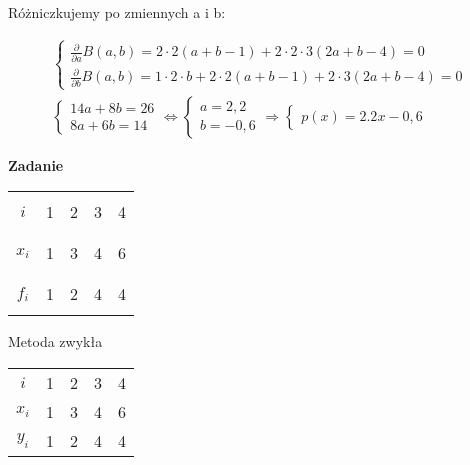 \documentclass[10pt, a4paper]{article}
\begin{document}
Różniczkujemy po zmiennych a i b:

\begin{gather*}
\begin{cases}
\frac{\partial}{\partial a}B(a,b)=2\cdot2(a+b-1)+2\cdot2\cdot3(2a+b-4)=0\\
\frac{\partial}{\partial b}B(a,b)=1\cdot2\cdot b+2\cdot2(a+b-1)+2\cdot 3(2a+b-4)=0
\end{cases}\\
\begin{cases}
14a+8b=26\\
8a+6b=14
\end{cases}
\Longleftrightarrow
\begin{cases}
a=2,2\\
b=-0,6
\end{cases}
\Rightarrow
\begin{cases}
p(x)=2.2x-0,6
\end{cases}
\end{gather*}

\textbf{Zadanie}

\begin{center}
\begin{tabular}{|c|c|c|c|c|}
\hline
&&&&\\
$i$&1&2&3&4\\
&&&&\\
\hline
&&&&\\
$x_i$&1&3&4&6\\
&&&&\\
\hline
&&&&\\
$f_i$&1&2&4&4\\
&&&&\\
\hline
\end{tabular}

Metoda zwykła
\end{center}

\begin{center}
\begin{tabular}{c c c c c}
$i$&1&2&3&4\\
$x_i$&1&3&4&6\\
$y_i$&1&2&4&4
\end{tabular}
\end{center}
\end{document}
